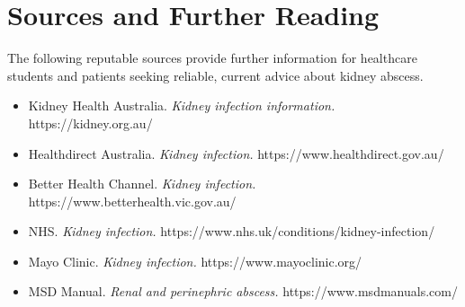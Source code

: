 \section*{Sources and Further Reading}
The following reputable sources provide further information for healthcare students and patients seeking reliable, current advice about kidney abscess.
\begin{itemize}
    \item Kidney Health Australia. \textit{Kidney infection information.} https://kidney.org.au/
    \item Healthdirect Australia. \textit{Kidney infection.} https://www.healthdirect.gov.au/
    \item Better Health Channel. \textit{Kidney infection.} https://www.betterhealth.vic.gov.au/
    \item NHS. \textit{Kidney infection.} https://www.nhs.uk/conditions/kidney-infection/
    \item Mayo Clinic. \textit{Kidney infection.} https://www.mayoclinic.org/
    \item MSD Manual. \textit{Renal and perinephric abscess.} https://www.msdmanuals.com/
\end{itemize}
